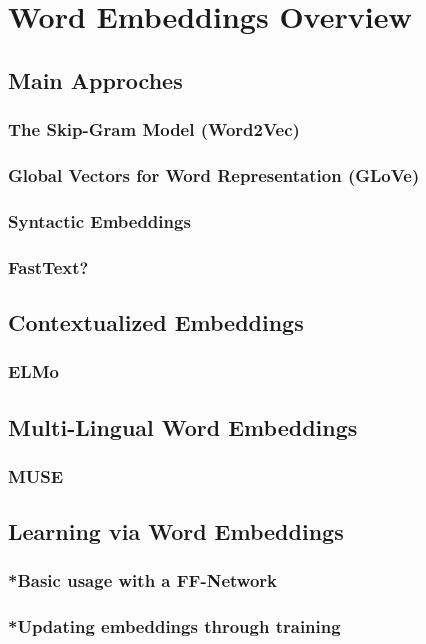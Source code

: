 \section{Word Embeddings Overview}
\subsection{Main Approches}
\subsubsection{The Skip-Gram Model (Word2Vec)}
\subsubsection{Global Vectors for Word Representation (GLoVe)}
\subsubsection{Syntactic Embeddings}
\subsubsection{FastText?}
\subsection{Contextualized Embeddings}
\subsubsection{ELMo}
\subsection{Multi-Lingual Word Embeddings}
\subsubsection{MUSE}
\subsection{Learning via Word Embeddings}
\subsubsection{*Basic usage with a FF-Network}
\subsubsection{*Updating embeddings through training}
